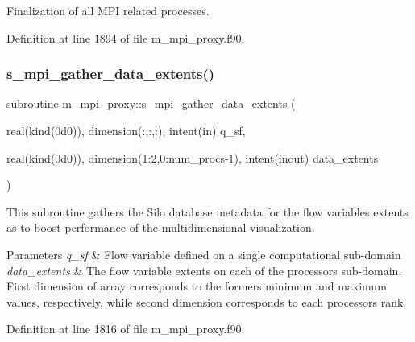 Finalization of all M\+PI related processes. 



Definition at line 1894 of file m\+\_\+mpi\+\_\+proxy.\+f90.

\mbox{\label{namespacem__mpi__proxy_a0b226acd5a9097566685604292c3ae0d}} 
\subsubsection{\texorpdfstring{s\+\_\+mpi\+\_\+gather\+\_\+data\+\_\+extents()}{s\_mpi\_gather\_data\_extents()}}
{\footnotesize\ttfamily subroutine m\+\_\+mpi\+\_\+proxy\+::s\+\_\+mpi\+\_\+gather\+\_\+data\+\_\+extents (\begin{DoxyParamCaption}\item[{real(kind(0d0)), dimension(\+:,\+:,\+:), intent(in)}]{q\+\_\+sf,  }\item[{real(kind(0d0)), dimension(1\+:2,0\+:num\+\_\+procs-\/1), intent(inout)}]{data\+\_\+extents }\end{DoxyParamCaption})}



This subroutine gathers the Silo database metadata for the flow variable\textquotesingle{}s extents as to boost performance of the multidimensional visualization. 


\begin{DoxyParams}{Parameters}
{\em q\+\_\+sf} & Flow variable defined on a single computational sub-\/domain \\
\hline
{\em data\+\_\+extents} & The flow variable extents on each of the processor\textquotesingle{}s sub-\/domain. First dimension of array corresponds to the former\textquotesingle{}s minimum and maximum values, respectively, while second dimension corresponds to each processor\textquotesingle{}s rank. \\
\hline
\end{DoxyParams}


Definition at line 1816 of file m\+\_\+mpi\+\_\+proxy.\+f90.

\mbox{\label{namespacem__mpi__proxy_ab2ced8f095b812fcc355539c2c5fa162}} 
